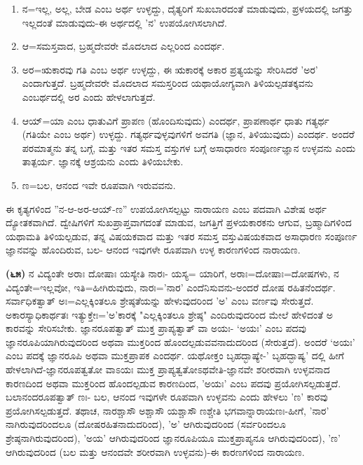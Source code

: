 \begin{enumerate}
\item ನ=ಇಲ್ಲ, ಅಲ್ಲ, ಬೇಡ ಎಂಬ ಅರ್ಥ ಉಳ್ಳದ್ದು, ದೈತ್ಯರಿಗೆ ಸುಖಬಾರದಂತೆ ಮಾಡುವುದು, ಪ್ರಳಯದಲ್ಲಿ ಜಗತ್ತು ಇಲ್ಲದಂತೆ ಮಾಡುವುದು-ಈ ಅರ್ಥದಲ್ಲಿ 'ನ' ಉಪಯೋಗಿಸಲಾಗಿದೆ.

 \item ಆ=ಸಮಸ್ತವಾದ, ಬ್ರಹ್ಮದೇವರೇ ಮೊದಲಾದ ಎಲ್ಲರಿಂದ ಎಂದರ್ಥ.

 \item ಅರ=ಋಕಾರವು ಗತಿ ಎಂಬ ಅರ್ಥ ಉಳ್ಳದ್ದು, ಈ ಋಕಾರಕ್ಕೆ ಅಕಾರ ಪ್ರತ್ಯಯನ್ನು ಸೇರಿಸಿದರೆ 'ಅರ' ಎಂದಾಗುತ್ತದೆ. ಬ್ರಹ್ಮದೇವರೇ ಮೊದಲಾದ ಸಮಸ್ತರಿಂದ ಯಥಾಯೋಗ್ಯವಾಗಿ ತಿಳಿಯಲ್ಪಡತಕ್ಕವನು ಎಂಬರ್ಥದಲ್ಲಿ ಅರ ಎಂದು ಹೇಳಲಾಗುತ್ತದೆ.

 \item ಆಯ್=ಯಾ ಎಂಬ ಧಾತುವಿಗೆ ಪ್ರಾಪಣ (ಹೊಂದಿಸುವುದು) ಎಂದರ್ಥ, ಪ್ರಾಪಣಾರ್ಥ ಧಾತು ಗತ್ಯರ್ಥ (ಗತಿಯೇ ಎಂಬ ಅರ್ಥ) ಉಳ್ಳದ್ದು. ಗತ್ಯರ್ಥವುಳ್ಳವುಗಳಿಗೆ ಅವಗತಿ (ಜ್ಞಾನ, ತಿಳಿಯುವುದು) ಎಂದರ್ಥ. ಅಂದರೆ ಪರಮಾತ್ಮನು ತನ್ನ ಬಗ್ಗೆ, ಮತ್ತು ಇತರ ಸಮಸ್ತ ವಸ್ತುಗಳ ಬಗ್ಗೆ ಅಸಾಧಾರಣ ಸಂಪೂರ್ಣಜ್ಞಾನ ಉಳ್ಳವನು ಎಂದು ತಾತ್ಪರ್ಯ. ಜ್ಞಾನಕ್ಕೆ ಆಶ್ರಯನು ಎಂದು ತಿಳಿಯಬೇಕು.

 \item ಣ=ಬಲ, ಆನಂದ ಇವೇ ರೂಪವಾಗಿ ಇರುವವನು.

\end{enumerate}

ಈ ಕೃತ್ಯಗಳಿಂದ ''ನ-ಆ-ಅರ-ಆಯ್-ಣ'' ಉಪಯೋಗಿಸಲ್ಪಟ್ಟು ನಾರಾಯಣ ಎಂಬ ಪದವಾಗಿ ವಿಶೇಷ ಅರ್ಥ ದ್ಯೋತಕವಾಗಿದೆ. ದ್ವೇಷಿಗಳಿಗೆ ಸುಖಪ್ರಾಪ್ತವಾಗದಂತೆ ಮಾಡುವ, ಜಗತ್ತಿಗೆ ಪ್ರಳಯಕಾರಕನು ಆಗುವ, ಬ್ರಹ್ಮಾದಿಗಳಿಂದ ಯಥಾಮತಿ ತಿಳಿಯಲ್ಪಡುವ, ತನ್ನ ವಿಷಯಕವಾದ ಮತ್ತು ಇತರ ಸಮಸ್ತ ವಸ್ತುವಿಷಯಕವಾದ ಅಸಾಧಾರಣ ಸಂಪೂರ್ಣ ಜ್ಞಾನವನ್ನು ಹೊಂದಿರುವ, ಬಲ- ಆನಂದ ಇವುಗಳೇ ರೂಪವಾಗಿ ಉಳ್ಳ ಕಾರಣಗಳಿಂದ ನಾರಾಯಣ.

\textbf{(೬೫)} ನ ವಿದ್ಯಂತೇ ಅರಾಃ ದೋಷಾಃ ಯಸ್ಯೇತಿ ನಾರಃ- ಯಸ್ಯ= ಯಾರಿಗೆ, ಅರಾಃ=ದೋಷಾಃ=ದೋಷಗಳು, ನ ವಿದ್ಯಂತೇ=ಇಲ್ಲವೋ, ಇತಿ=ಹೀಗಿರುವುದು, ನಾರಃ=\-'ನಾರ' ಎಂದೆನಿಸುವನು-ಅಂದರೆ ದೋಷ ರಹಿತನೆಂದರ್ಥ. ಸರ್ವಾಧಿಕತ್ವಾತ್ ಅಃ=\break ಎಲ್ಲಕ್ಕಿಂತಲೂ ಶ್ರೇಷ್ಠತೆಯನ್ನು ಹೇಳುವುದರಿಂದ 'ಅ' ಎಂಬ ವರ್ಣವು ಸೇರುತ್ತದೆ. ಅಕಾರಸ್ಯಾಧಿಕಾರ್ಥತಃ ಇತ್ಯುಕ್ತೇಃ='ಅ'ಕಾರಕ್ಕೆ "ಎಲ್ಲಕ್ಕಿಂತಲೂ ಶ್ರೇಷ್ಠ" ಎಂದಿರುವುದರಿಂದ ಮೇಲೆ ಹೇಳಿದಂತೆ ಅ ಕಾರವನ್ನು ಸೇರಿಸಬೇಕು. ಜ್ಞಾನರೂಪತ್ವಾತ್ ಮುಕ್ತ ಪ್ರಾಪ್ಯತ್ವಾತ್ ವಾ ಅಯಃ- `ಅಯಃ' ಎಂಬ ಪದವು ಜ್ಞಾನರೂಪಿಯಾಗಿರುವುದರಿಂದ ಅಥವಾ ಮುಕ್ತರಿಂದ ಹೊಂದಲ್ಪಡುವವನಾದುದರಿಂದ (ಸೇರುತ್ತದೆ). ಅಂದರೆ `ಅಯಃ' ಎಂಬ ಪದಕ್ಕೆ ಜ್ಞಾನರೂಪಿ ಅಥವಾ ಮುಕ್ತಪ್ರಾಪಕ ಎಂದರ್ಥ. ಯಥೋಕ್ತಂ ಬೃಹದ್ಭಾಷ್ಯೇ-' ಬೃಹದ್ಭಾಷ್ಯ' ದಲ್ಲಿ ಹೀಗೆ ಹೇಳ\-ಲಾಗಿದೆ-ಜ್ಞಾನರೂಪತ್ವತೋ ವಾಽಯಃ ಮುಕ್ತ ಪ್ರಾಪ್ಯತ್ವತೋಽಥವೇತಿ-ಜ್ಞಾನವೇ ಶರೀರವಾಗಿ ಉಳ್ಳವನಾದ ಕಾರಣದಿಂದ ಅಥವಾ ಮುಕ್ತರಿಂದ ಹೊಂದಲ್ಪಡುವ ಕಾರಣದಿಂದ, 'ಅಯಃ' ಎಂಬ ಪದವು ಪ್ರಯೋಗಿಸಲ್ಪಡುತ್ತದೆ. ಬಲಾನಂದರೂಪತ್ವಾತ್ ಣಃ- ಬಲ, ಆನಂದ ಇವುಗಳೇ ರೂಪವಾಗಿ ಉಳ್ಳವನು ಎಂದು ಹೇಳಲು 'ಣ' ಕಾರವು ಪ್ರಯೋಗಿಸಲ್ಪಡುತ್ತದೆ. ತಥಾಚ, ನಾರಶ್ಚಾಸೌ ಅಶ್ಚಾಸೌ ಯಶ್ಚಾಸೌ ಣಶ್ಚೇತಿ ಭಗವಾನ್ನಾರಾಯಣಃ-ಹೀಗೆ, 'ನಾರ' ನಾಗಿರುವುದರಿಂದಲೂ (ದೋಷರಹಿತನಾದುದರಿಂದ), 'ಅ' ಆಗಿರುವುದರಿಂದ (ಸರ್ವರಿಂದಲೂ ಶ್ರೇಷ್ಠನಾಗಿರುವುದರಿಂದ), 'ಅಯ' ಆಗಿರುವುದರಿಂದ ಜ್ಞಾನರೂಪಿಯೂ ಮುಕ್ತಪ್ರಾಪ್ಯನೂ ಆಗಿರುವುದರಿಂದ), 'ಣ' ಆಗಿರುವುದರಿಂದ (ಬಲ ಮತ್ತು ಆನಂದವೇ ಶರೀರವಾಗಿ ಉಳ್ಳವನು)-ಈ ಕಾರಣಗಳಿಂದ ನಾರಾಯಣ.

